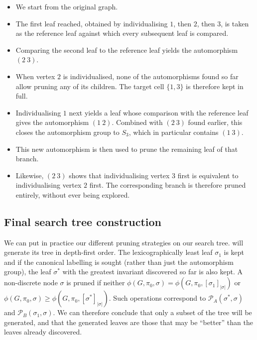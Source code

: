   \begin{itemize}
    \item[\textcircled{1}] We start from the original graph.
    \item[\textcircled{2}] The first leaf reached, obtained by individualising $1$, then $2$, then $3$, is taken as the reference leaf against which every subsequent leaf is compared.
    \item[\textcircled{3}] Comparing the second leaf to the reference leaf yields the automorphism $(2\ 3)$.
    \item[\textcircled{4}] When vertex $2$ is individualised, none of the automorphisms found so far allow pruning any of its children. The target cell $\{1,3\}$ is therefore kept in full.
    \item[\textcircled{5}] Individualising $1$ next yields a leaf whose comparison with the reference leaf gives the automorphism $(1\ 2)$. Combined with $(2\ 3)$ found earlier, this closes the automorphism group to $S_3$, which in particular contains $(1\ 3)$.
    \item[\textcircled{6}] This new automorphism is then used to prune the remaining leaf of that branch.
    \item[\textcircled{7}] Likewise, $(2\ 3)$ shows that individualising vertex $3$ first is equivalent to individualising vertex $2$ first. The corresponding branch is therefore pruned entirely, without ever being explored.
  \end{itemize}

\subsection{Final search tree construction}

We can put in practice our different pruning strategies on our search tree. \Naut{} will generate its tree in depth-first order. The lexicographically least leaf $\sigma_1$ is kept and if the canonical labelling is sought (rather than just the automorphism group), the leaf $\sigma^*$ with the greatest invariant discovered so far is also kept. A non-discrete node $\sigma$ is pruned if neither $\phi(G,\pi_0, \sigma) = \phi(G,\pi_0, {[\sigma_1]}_{|\sigma|})$ or $\phi(G,\pi_0, \sigma) \geq\phi(G,\pi_0, {[\sigma^*]}_{|\sigma|})$. Such operations correspond to $\mathcal{P}_A (\sigma^*, \sigma)$ and $\mathcal{P}_B (\sigma_1, \sigma)$. We can therefore conclude that only a subset of the tree will be generated, and that the generated leaves are those that may be ``better'' than the leaves already discovered.



